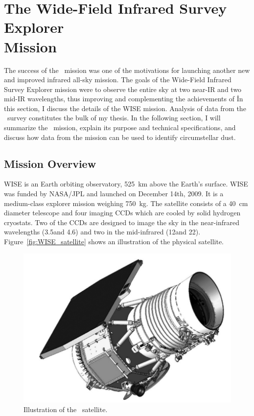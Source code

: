    
\section{The Wide-Field Infrared Survey Explorer\\ Mission}\label{sec:wise_intro}

    The success of the \iras\ mission was one of the motivations for launching another new and improved infrared all-sky mission. The goals of the Wide-Field Infrared Survey Explorer mission \citep[WISE;][]{Wright2010} were to observe the entire sky at two near-IR and two mid-IR wavelengths, thus improving and complementing the achievements of \iras\. In this section, I discuss the details of the WISE mission. Analysis of data from the \WS\ survey constitutes the bulk of my thesis. In the following section, I will summarize the \WS\ mission, explain its purpose and technical specifications, and discuss how data from the mission can be used to identify circumstellar dust. 
   

    \subsection{Mission Overview}\label{sec:wise_overview}


    WISE is an Earth orbiting observatory, 525~km above the Earth's surface. WISE was funded by NASA/JPL and launched on December 14th, 2009. It is a medium-class explorer mission weighing 750~kg. The satellite consists of a 40~cm diameter telescope and four imaging CCDs which are cooled by solid hydrogen cryostats. Two of the CCDs are designed to image the sky in the near-infrared wavelengths (3.5\micron and 4.6\micron) and two in the mid-infrared (12\micron and 22\micron). Figure~\ref{fig:WISE_satellite} shows an illustration of the physical satellite. 
  
    
    \begin{figure}
    \centering
    \includegraphics[width=\textwidth]{Ch2/wise_satellite}
    \caption[\WS\ Satellite]{Illustration of the \WS\ satellite.}
    \label{fig:WISE_Satellite}
    \end{figure}
    
